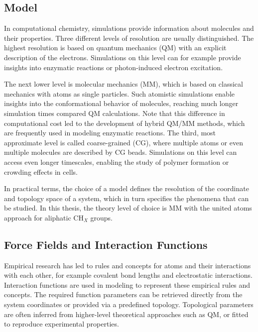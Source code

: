 \subsection{Model}
In computational chemistry, simulations provide information about molecules and their properties. Three different levels of resolution are usually distinguished.\cite{Barros2022}
The highest resolution is based on quantum mechanics (QM) with an explicit description of the electrons.\cite{Senn2009} Simulations on this level can for example provide insights into enzymatic reactions \cite{Sheng2020, Kazemi2015, Ryde2003,Naray2003} or photon-induced electron excitation\cite{Rivera2019, Li2008, Askerka2017}.  

The next lower level is molecular mechanics (MM), which is based on classical mechanics with atoms as single particles. Such atomistic simulations enable insights into the conformational behavior of molecules, \cite{Witek2016, Wang2021, Schenkmayerova2021, Mccammon1977} reaching much longer simulation times compared QM calculations. Note that this difference in computational cost led to the development of hybrid QM/MM methods, which are frequently used in modeling enzymatic reactions.\cite{Senn2009}
The third, most approximate level is called coarse-grained (CG), where multiple atoms or even multiple molecules are described by CG beads.\cite{Tozzini2005} Simulations on this level can access even longer timescales, enabling the study of polymer formation \cite{Hyeon2011, Shen2009} or crowding effects in cells\cite{Hong2020, Friedel2003}. 

In practical terms, the choice of a model defines the resolution of the coordinate and topology space of a system, which in turn specifies the phenomena that can be studied. In this thesis, the theory level of choice is MM with the united atoms approach\cite{Daura1998} for aliphatic CH$_X$ groups. 

\subsection{Force Fields and Interaction Functions}
Empirical research has led to rules and concepts for atoms and their interactions with each other, for example covalent bond lengths and electrostatic interactions.\cite{Morse1929, Pauling1934, Gillmor2017} 
Interaction functions are used in modeling to represent these empirical rules and concepts. The required function parameters can be retrieved directly from the system coordinates or provided via a predefined topology.  \cite{Mackerell2004, Cornell1995, Oostenbrink2004} 
Topological parameters are often inferred from higher-level theoretical approaches such as QM, or fitted to reproduce experimental properties. \cite{Ponder2003, Oostenbrink2004, Jorgensen2005, Riniker2018}

